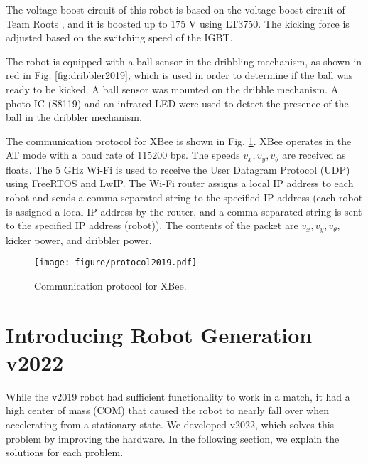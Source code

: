 \documentclass[]{llncs}
\begin{document}
The voltage boost circuit of this robot is based on the voltage boost circuit of Team Roots \cite{roots}, and it is boosted up to 175 V using LT3750. The kicking force is adjusted based on the switching speed of the IGBT.
%

The robot is equipped with a ball sensor in the dribbling mechanism, as shown in red in Fig. \ref{fig:dribbler2019}, which is used in order to determine if the ball was ready to be kicked.
%
A ball sensor was mounted on the dribble mechanism.
%
A photo IC (S8119) and an infrared LED were used to detect the presence of the ball in the dribbler mechanism.
%

The communication protocol for XBee is shown in Fig. \ref{fig:protocol2019}. XBee operates in the AT mode with a baud rate of 115200 bps.
%
The speeds $v_x,v_y,v_{\theta}$ are received as floats.
%
The 5 GHz Wi-Fi is used to receive the User Datagram Protocol (UDP) using FreeRTOS and LwIP.
%
The Wi-Fi router assigns a local IP address to each robot and sends a comma separated string to the specified IP address (each robot is assigned a local IP address by the router, and a comma-separated string is sent to the specified IP address (robot)).
%
The contents of the packet are $v_x,v_y,v_{\theta}$, kicker power, and dribbler power.
%
%
\begin{figure}[ttbp]
    \centering
    \texttt{[image: figure/protocol2019.pdf]}
    \caption{Communication protocol for XBee.}
    \label{fig:protocol2019}
\end{figure}


\section{Introducing Robot Generation v2022}
%
While the v2019 robot had sufficient functionality to work in a match, it had a high center of mass (COM) that caused the robot to nearly fall over when accelerating from a stationary state.
%
We developed v2022, which solves this problem by improving the hardware.
%
In the following section, we explain the solutions for each problem.
%
\end{document}
